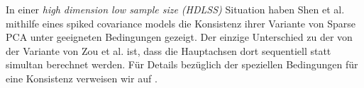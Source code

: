 In einer \textit{high dimension low sample size (HDLSS)} Situation haben Shen et al. mithilfe eines spiked covariance models die Konsistenz ihrer Variante von Sparse PCA \cite{shen} unter geeigneten Bedingungen gezeigt. Der einzige Unterschied zu der von der Variante von Zou et al. ist, dass die Hauptachsen dort sequentiell statt simultan berechnet werden. Für Details bezüglich der speziellen Bedingungen für eine Konsistenz verweisen wir auf \cite{shen_consistency}.